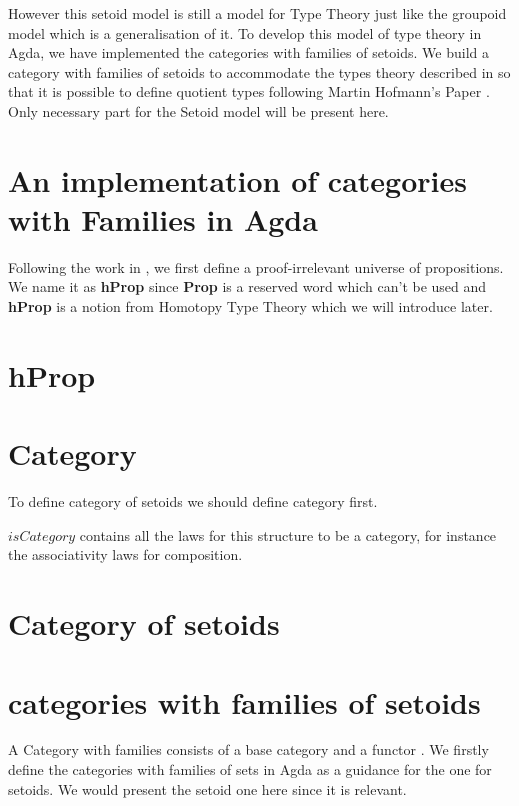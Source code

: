 However this setoid model is still a model for Type
Theory just like the groupoid model which is a generalisation of it.
To develop this model of type theory in Agda, we have implemented the
categories with families of setoids. 
We build a category with families of setoids to accommodate the types theory described in
\cite{alti:lics99}  so that it is possible to define quotient types
following Martin Hofmann's Paper \cite{hof:95:sm}.  Only necessary
part for the Setoid model will be present here.


\section{An implementation of categories with Families in Agda}

Following the work in \cite{alti:99}, we first define a
proof-irrelevant universe of propositions. We name it as \textbf{hProp}
since \textbf{Prop} is a  reserved word which can't be used and
\textbf{hProp} is a notion from Homotopy Type Theory which we will introduce later.

\section{hProp}


\section{Category}

To define category of setoids we should define category first.



$isCategory$ contains all the laws for this structure to be a category, for instance the
associativity laws for composition.

\section{Category of setoids}





\section{categories with families of setoids}


A Category with families consists of a base category and a functor
\cite{clairambault2005categories}. We firstly define the categories with
families of sets in Agda  as a guidance for the one for setoids. We
would present the setoid one here since it is relevant.

